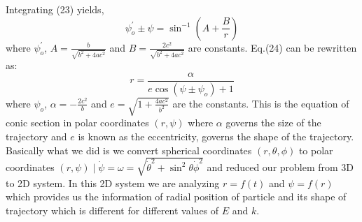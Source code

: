 \documentclass[conference]{IEEEtran}
\begin{document}
Integrating (23) yields, \begin{dmath}
    \psi_{o}^{'} \pm \psi = \sin^{-1}{\left(A + \frac{B}{r}\right)}
\end{dmath} where $\psi_{o}^{'}$, $A = \frac{b}{\sqrt{b^{2} + 4ac^{2}}}$ and $B = \frac{2c^{2}}{\sqrt{b^{2} + 4ac^{2}}}$ are constants. Eq.(24) can be rewritten as: \begin{dmath}r = \frac{\alpha}{e\cos \left(\psi \pm \psi_{o}\right) + 1}\end{dmath} where $\psi_{o}$, $\alpha = -\frac{2c^{2}}{b}$ and $e = \sqrt{1 + \frac{4ac^{2}}{b^{2}}}$ are the constants. This is the equation of conic section in polar coordinates $(r, \psi)$ where $\alpha$ governs the size of the trajectory and $e$ is known as the eccentricity, governs the shape of the trajectory. Basically what we did is we convert spherical coordinates $(r,\theta,\phi)$ to polar coordinates $(r,\psi) \mid \dot{\psi} = \omega = \sqrt{\dot{\theta}^{2} + \sin^2{\theta}\dot{\phi}^{2}}$ and reduced our problem from 3D to 2D system. In this 2D system we are analyzing $r = f(t)$ and $\psi = f(r)$ which provides us the information of radial position of particle and its shape of trajectory which is different for different values of $E$ and $k$. 
\end{document}
